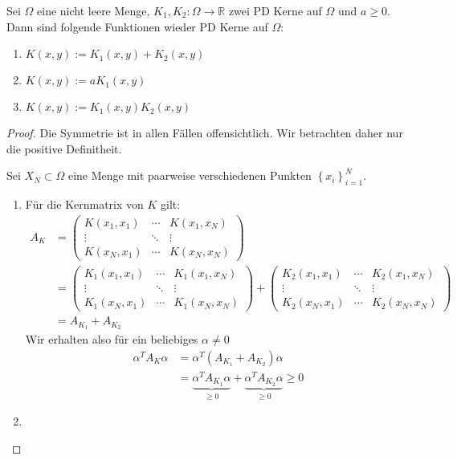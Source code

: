 \begin{theorem}
\label{thm:Kombi}
Sei $\Omega$ eine nicht leere Menge, $K_1, K_2:\Omega \rightarrow \mathbb{R}$ zwei \ac{PD} Kerne auf $\Omega$ und $a \geq 0$. Dann sind folgende Funktionen wieder \ac{PD} Kerne auf $\Omega$:
\begin{enumerate}
\item
$K(x,y) := K_1(x,y) + K_2(x,y)$
\item
$K(x,y) := aK_1 (x,y)$
\item
$K(x,y) := K_1(x,y)K_2(x,y)$
\end{enumerate}
\end{theorem}
\begin{proof}
Die Symmetrie ist in allen Fällen offensichtlich. Wir betrachten daher nur die positive Definitheit.

Sei $X_N \subset \Omega$ eine Menge mit paarweise verschiedenen Punkten $\left\{x_i\right\}_{i=1}^N$.
\begin{enumerate}
\item
Für die Kernmatrix von $K$ gilt:
\begin{align*}
A_K &= 
\begin{pmatrix}
K(x_1, x_1) & \cdots & K(x_1, x_N) \\ 
\vdots & \ddots & \vdots \\ 
K(x_N, x_1) & \cdots & K(x_N, x_N)
\end{pmatrix} \\
&=
\begin{pmatrix}
K_1(x_1, x_1) & \cdots & K_1(x_1, x_N) \\ 
\vdots & \ddots & \vdots \\ 
K_1(x_N, x_1) & \cdots & K_1(x_N, x_N)
\end{pmatrix} 
+
\begin{pmatrix}
K_2(x_1, x_1) & \cdots & K_2(x_1, x_N) \\ 
\vdots & \ddots & \vdots \\ 
K_2(x_N, x_1) & \cdots & K_2(x_N, x_N)
\end{pmatrix} \\
&= A_{K_1} + A_{K_2}
\end{align*}
Wir erhalten also für ein beliebiges $\alpha \neq 0$
\begin{align*}
\alpha^T A_K \alpha &= \alpha^T \left( A_{K_1} + A_{K_2} \right) \alpha \\
&=\underbrace{\alpha^T A_{K_1} \alpha}_{\geq 0} + \underbrace{\alpha^T A_{K_2} \alpha}_{\geq 0} \geq 0
\end{align*}
\item

\end{enumerate}
\end{proof}
